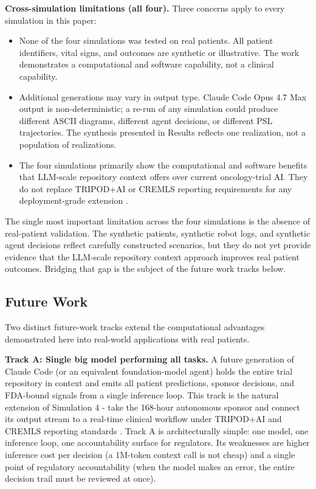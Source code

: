 \textbf{Cross-simulation limitations (all four).} Three concerns apply
to every simulation in this paper:

\begin{itemize}[leftmargin=*]
\item None of the four simulations was tested on real patients. All
patient identifiers, vital signs, and outcomes are synthetic or
illustrative. The work demonstrates a computational and software
capability, not a clinical capability.

\item Additional generations may vary in output type. Claude Code
Opus 4.7 Max output is non-deterministic; a re-run of any simulation
could produce different ASCII diagrams, different agent decisions, or
different PSL trajectories. The synthesis presented in Results
reflects one realization, not a population of realizations.

\item The four simulations primarily show the computational and
software benefits that LLM-scale repository context offers over
current oncology-trial AI. They do not replace TRIPOD+AI or CREMLS
reporting requirements for any deployment-grade extension
\cite{Collins2024TRIPODAI, ElEmam2024CREMLS}.
\end{itemize}

The single most important limitation across the four simulations is
the absence of real-patient validation. The synthetic patients,
synthetic robot logs, and synthetic agent decisions reflect carefully
constructed scenarios, but they do not yet provide evidence that the
LLM-scale repository context approach improves real patient outcomes.
Bridging that gap is the subject of the future work tracks below.

\subsection{Future Work}
\label{sec:limits-future}

Two distinct future-work tracks extend the computational advantages
demonstrated here into real-world applications with real patients.

\textbf{Track A: Single big model performing all tasks.} A future
generation of Claude Code (or an equivalent foundation-model agent)
holds the entire trial repository in context and emits all patient
predictions, sponsor decisions, and FDA-bound signals from a single
inference loop. This track is the natural extension of Simulation 4
- take the 168-hour autonomous sponsor and connect its output stream
to a real-time clinical workflow under TRIPOD+AI and CREMLS reporting
standards \cite{Collins2024TRIPODAI, ElEmam2024CREMLS}. Track A is
architecturally simple: one model, one inference loop, one
accountability surface for regulators. Its weaknesses are higher
inference cost per decision (a 1M-token context call is not cheap)
and a single point of regulatory accountability (when the model
makes an error, the entire decision trail must be reviewed at once).

